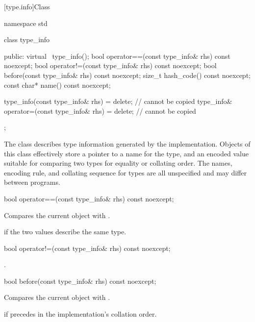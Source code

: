 [type.info]{Class }

%
\begin{codeblock}
namespace std {
  class type_info {
  public:
    virtual ~type_info();
    bool operator==(const type_info& rhs) const noexcept;
    bool operator!=(const type_info& rhs) const noexcept;
    bool before(const type_info& rhs) const noexcept;
    size_t hash_code() const noexcept;
    const char* name() const noexcept;

    type_info(const type_info& rhs) = delete;                   // cannot be copied
    type_info& operator=(const type_info& rhs) = delete;        // cannot be copied
  };
}
\end{codeblock}

\pnum
The class
describes type information generated by the implementation.
Objects of this class effectively store a pointer to a name for the type, and
an encoded value suitable for comparing two types for equality or collating order.
The names, encoding rule, and collating sequence for types are all unspecified
%
and may differ between programs.

%
\begin{itemdecl}
bool operator==(const type_info& rhs) const noexcept;
\end{itemdecl}

\begin{itemdescr}
\pnum
\effects
Compares the current object with .

\pnum
\returns
{}
if the two values describe the same type.
\end{itemdescr}

%
\begin{itemdecl}
bool operator!=(const type_info& rhs) const noexcept;
\end{itemdecl}

\begin{itemdescr}
\pnum
\returns
{}.
\end{itemdescr}

%
\begin{itemdecl}
bool before(const type_info& rhs) const noexcept;
\end{itemdecl}

\begin{itemdescr}
\pnum
\effects
Compares the current object with .

\pnum
\returns
{}
if
precedes  in the implementation's collation order.
\end{itemdescr}

